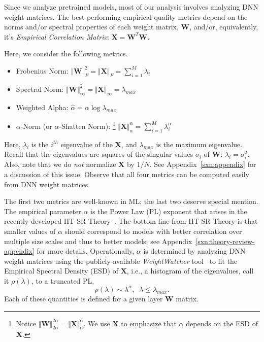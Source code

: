 Since we analyze pretrained models, most of our analysis involves analyzing DNN weight matrices.
The best performing empirical quality metrics depend on the norms and/or spectral properties of each weight matrix,
$\mathbf{W}$, and/or, equivalently, it's \emph{Empirical Correlation Matrix}: $\mathbf{X}=\mathbf{W}^{T}\mathbf{W}$.%

Here, we consider the following metrics.

\begin{itemize}
\item 
Frobenius Norm: $\Vert\mathbf{W}\Vert^{2}_{F}=\Vert\mathbf{X}\Vert_{F}=\sum_{i=1}^{M} \lambda_{i}$
\item 
Spectral Norm: $\Vert\mathbf{W}\Vert_{\infty}^{2}=\Vert\mathbf{X}\Vert_{\infty}=\lambda_{max}$
\item 
Weighted Alpha: $\hat{\alpha}=\alpha\log\lambda_{max}$
\item 
$\alpha$-Norm (or $\alpha$-Shatten Norm):%
\footnote{Notice $\Vert\mathbf{W}\Vert^{2\alpha}_{2\alpha}=\Vert\mathbf{X}\Vert^{\alpha}_{\alpha}$. We use $\mathbf{X}$ to emphasize that $\alpha$ depends on the ESD of $\mathbf{X}$.}
 $\Vert\mathbf{X}\Vert^{\alpha}_{\alpha}=\sum_{i=1}^{M}\lambda_{i}^{\alpha}$
\end{itemize}
Here, $\lambda_{i}$ is the $i^{th}$ eigenvalue of the $\mathbf{X}$, and $\lambda_{max}$ is the maximum eigenvalue.
Recall that the eigenvalues are squares of the singular values $\sigma_{i}$ of $\mathbf{W}$: $\lambda_{i}=\sigma^{2}_{i}$.
Also, note that we do \emph{not} normalize $\mathbf{X}$ by $1/N$.
See Appendix~\ref{sxn:appendix} for a discussion of this issue.
Observe that all four metrics can be computed easily from DNN weight matrices.

The first two metrics are well-known in ML; the last two deserve special mention.
The empirical parameter $\alpha$ is the Power Law (PL) exponent that arises in the recently-developed HT-SR Theory~\cite{MM18_TR, MM19_HTSR_ICML, MM20_SDM}.
The bottom line from HT-SR Theory is that smaller values of $\alpha$ should correspond to models with better correlation over multiple size scales and thus to better models; see Appendix~\ref{sxn:theory-review-appendix} for more details.
Operationally, $\alpha$ is determined by analyzing DNN weight matrices using the publicly-available \emph{WeightWatcher} tool~\cite{weightwatcher_package} to fit the Empirical Spectral Density (ESD) of $\mathbf{X}$, i.e., a histogram of the eigenvalues, call it $\rho(\lambda)$, to a truncated PL, 
\begin{equation}
\rho(\lambda)\sim\lambda^{\alpha},\;\;\lambda\le\lambda_{max}.
\end{equation}
Each of these quantities is defined for a given layer $\mathbf{W}$ matrix.

